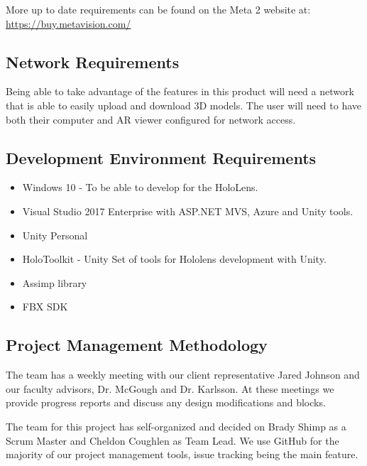 More up to date requirements can be found on the Meta 2 website at: 
\url{https://buy.metavision.com/}

\subsection{Network Requirements}

Being able to take advantage of the features in this product will need a network
that is able to easily upload and download 3D models. The user will need to have
both their computer and AR viewer configured for network access.

\subsection{Development Environment Requirements}
\begin{itemize}
	\item Windows 10 - To be able to develop for the HoloLens.
	\item Visual Studio 2017 Enterprise with ASP.NET MVS, Azure and Unity tools.
	\item Unity Personal
	\item HoloToolkit - Unity Set of tools for Hololens development with Unity.
	\item Assimp library
	\item FBX SDK
\end{itemize}


\subsection{Project Management Methodology}
The team has a weekly meeting with our client representative Jared Johnson and 
our faculty advisors, Dr. McGough and Dr. Karlsson. At these meetings we provide
progress reports and discuss any design modifications and blocks.

The team for this project has self-organized and decided on Brady Shimp as a
Scrum Master and Cheldon Coughlen as Team Lead. We use GitHub for the majority 
of our project management tools, issue tracking being the main feature.



